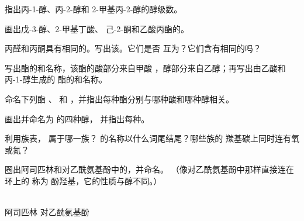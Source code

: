 \begin{exercise}[$\star$]\label{exo:g11:functional-groups:5}
指出丙-1-醇、丙-2-醇和 2-甲基丙-2-醇的醇级数。
\end{exercise}

\begin{exercise}[$\star\star$]\label{exo:g11:functional-groups:6}
画出戊-3-醇、2-甲基丁酸、
己-2-酮和乙酸丙酯的。
\end{exercise}

\begin{exercise}[$\star\star$]\label{exo:g11:functional-groups:7}
丙醛和丙酮具有相同的。写出该。它们是否
互为？它们含有相同的吗？
\end{exercise}

\begin{exercise}[$\star\star$]\label{exo:g11:functional-groups:8}
写出酯的和名称，该酯的酸部分来自甲酸
，醇部分来自乙醇；再写出由乙酸和丙-1-醇生成的
酯的和名称。
\end{exercise}

\begin{exercise}[$\star\star$]\label{exo:g11:functional-groups:9}
命名下列酯 、 和
，并指出每种酯分别与哪种酸和哪种醇相关。
\end{exercise}

\begin{exercise}[$\star\star$]\label{exo:g11:functional-groups:10}
画出并命名为  的四种醇，
并指出每种。
\end{exercise}

\begin{exercise}[$\star\star$]\label{exo:g11:functional-groups:11}
利用族表， 属于哪一族？
的名称以什么词尾结尾？哪些族的
羰基碳上同时连有氧或氮？
\end{exercise}

\begin{exercise}[$\star\star\star$]\label{exo:g11:functional-groups:12}
圈出阿司匹林和对乙酰氨基酚中的，并命名。
（像对乙酰氨基酚中那样直接连在环上的  称为
酚羟基，它的性质与醇不同。）
\begin{center}
\qquad
{}
\\[2pt] \small 阿司匹林 \hspace{4.2cm} 对乙酰氨基酚
\end{center}
\end{exercise}

